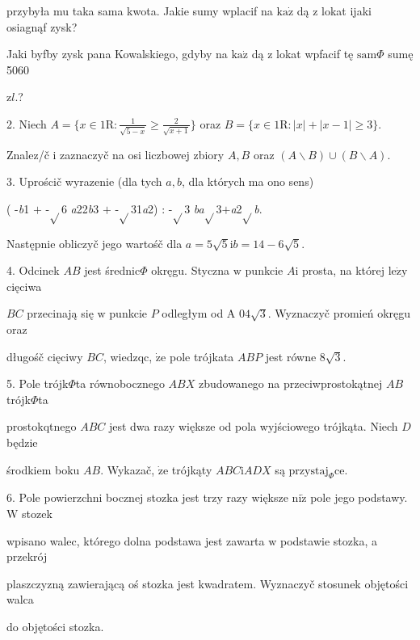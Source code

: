 \documentclass[a4paper,12pt]{article}
\begin{document}
przybyła mu taka sama kwota. Jakie sumy wplacif na $\mathrm{k}\mathrm{a}\dot{\mathrm{z}}$ dą $\mathrm{z}$ lokat ijaki osiagnąf zysk?

Jaki byfby zysk pana Kowalskiego, gdyby na $\mathrm{k}\mathrm{a}\dot{\mathrm{z}}$ dą $\mathrm{z}$ lokat wpfacif tę $\mathrm{s}\mathrm{a}\mathrm{m}\Phi$ sumę 5060

$\mathrm{z}l.$?

2. Niech $A=\displaystyle \{x\in 1\mathrm{R}:\frac{1}{\sqrt{5-x}}\geq\frac{2}{\sqrt{x+1}}\}$ oraz $B=\{x\in 1\mathrm{R}:|x|+|x-1|\geq 3\}.$

Znalez/č $\mathrm{i}$ zaznaczyč na osi liczbowej zbiory $A, B$ oraz $(A\backslash B)\cup(B\backslash A).$

3. Uprościč wyrazenie (dla tych $a, b$, dla których ma ono sens)

( -{\it b}1 $+$ -$\sqrt{}$6 {\it a}22{\it b}3 $+$ -$\sqrt{}$31{\it a}2) : -$\sqrt{}$3 {\it ba}$\sqrt{}$3$+${\it a}2$\sqrt{}${\it b}.

Następnie obliczyč jego wartośč dla $a=5\sqrt{5}\mathrm{i}b=14-6\sqrt{5}.$

4. Odcinek $AB$ jest średnic$\Phi$ okręgu. Styczna $\mathrm{w}$ punkcie $A\mathrm{i}$ prosta, na której $\mathrm{l}\mathrm{e}\dot{\mathrm{z}}\mathrm{y}$ cięciwa

$BC$ przecinają się $\mathrm{w}$ punkcie $P$ odległym od A $04\sqrt{3}$. Wyznaczyč promień okręgu oraz

długośč cięciwy $BC$, wiedzqc, $\dot{\mathrm{z}}\mathrm{e}$ pole trójkata $ABP$ jest równe $8\sqrt{3}.$

5. Pole trójk$\Phi$ta równobocznego $ABX$ zbudowanego na przeciwprostokątnej $AB$ trójk$\Phi$ta

prostokqtnego $ABC$ jest dwa razy większe od pola wyjściowego trójkąta. Niech $D$ będzie

środkiem boku $AB$. Wykazač, $\dot{\mathrm{z}}\mathrm{e}$ trójkąty $ABC\mathrm{i}ADX$ są $\mathrm{p}\mathrm{r}\mathrm{z}\mathrm{y}\mathrm{s}\mathrm{t}\mathrm{a}\mathrm{j}_{\Phi}\mathrm{c}\mathrm{e}.$

6. Pole powierzchni bocznej stozka jest trzy razy większe $\mathrm{n}\mathrm{i}\dot{\mathrm{z}}$ pole jego podstawy. $\mathrm{W}$ stozek

wpisano walec, którego dolna podstawa jest zawarta $\mathrm{w}$ podstawie stozka, a przekrój

plaszczyzną zawierającą oś stozka jest kwadratem. Wyznaczyč stosunek objętości walca

do objętości stozka.
\end{document}
